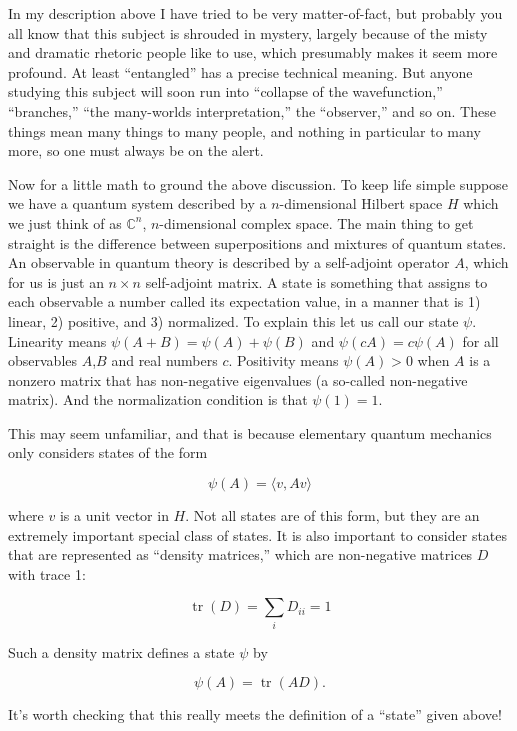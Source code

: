 \documentclass{article}
\begin{document}
In my description above I have tried to be very matter-of-fact, but
probably you all know that this subject is shrouded in mystery, largely
because of the misty and dramatic rhetoric people like to use, which
presumably makes it seem more profound. At least ``entangled'' has a
precise technical meaning. But anyone studying this subject will soon
run into ``collapse of the wavefunction,'' ``branches,'' ``the
many-worlds interpretation,'' the ``observer,'' and so on. These things
mean many things to many people, and nothing in particular to many more,
so one must always be on the alert.

Now for a little math to ground the above discussion. To keep life
simple suppose we have a quantum system described by a \(n\)-dimensional
Hilbert space \(H\) which we just think of as \(\mathbb{C}^n\),
\(n\)-dimensional complex space. The main thing to get straight is the
difference between superpositions and mixtures of quantum states. An
observable in quantum theory is described by a self-adjoint operator
\(A\), which for us is just an \(n\times n\) self-adjoint matrix. A
state is something that assigns to each observable a number called its
expectation value, in a manner that is 1) linear, 2) positive, and 3)
normalized. To explain this let us call our state \(\psi\). Linearity
means \(\psi(A + B) = \psi(A) + \psi(B)\) and \(\psi(cA) = c \psi(A)\)
for all observables \(A\),\(B\) and real numbers \(c\). Positivity means
\(\psi(A) > 0\) when \(A\) is a nonzero matrix that has non-negative
eigenvalues (a so-called non-negative matrix). And the normalization
condition is that \(\psi(1) = 1\).

This may seem unfamiliar, and that is because elementary quantum
mechanics only considers states of the form

\[\psi(A) = \langle v, Av\rangle\]

where \(v\) is a unit vector in \(H\). Not all states are of this form,
but they are an extremely important special class of states. It is also
important to consider states that are represented as ``density
matrices,'' which are non-negative matrices \(D\) with trace 1:

\[\operatorname{tr}(D) = \sum_i D_{ii} = 1\]

Such a density matrix defines a state \(\psi\) by

\[\psi(A) = \operatorname{tr}(AD).\]

It's worth checking that this really meets the definition of a ``state''
given above!
\end{document}
